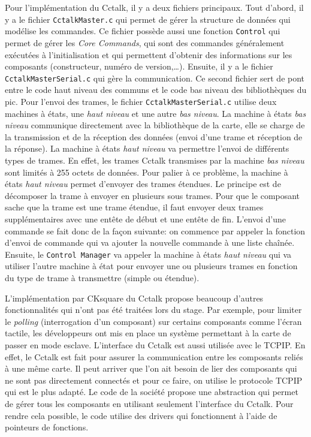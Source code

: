 \documentclass[a4paper]{article}
\begin{document}
Pour l'implémentation du Cctalk, il y a deux fichiers principaux. Tout d'abord,
il y a le fichier \verb|CctalkMaster.c| qui permet de gérer la structure de
données qui modélise les commandes. Ce fichier possède aussi une fonction
\verb|Control| qui permet de gérer les \textit{Core Commands}, qui sont des
commandes généralement exécutées à l'initialisation et qui permettent d'obtenir
des informations sur les composants (constructeur, numéro de version,\dots).
Ensuite, il y a le fichier \verb|CctalkMasterSerial.c| qui gère la
communication. Ce second fichier sert de pont entre le code haut niveau des
communs et le code bas niveau des bibliothèques du \gls{pic}. Pour l'envoi des
trames, le fichier \verb|CctalkMasterSerial.c| utilise deux machines à états,
une \textit{haut niveau} et une autre \textit{bas niveau}. La machine à états
\textit{bas niveau} communique directement avec la bibliothèque de la carte,
elle se charge de la transmission et de la réception des données (envoi d'une
trame et réception de la réponse). La machine à états \textit{haut niveau} va
permettre l'envoi de différents types de trames. En effet, les trames Cctalk
transmises par la machine \textit{bas niveau} sont limités à 255 octets de
données. Pour palier à ce problème, la machine à états \textit{haut niveau}
permet d'envoyer des trames étendues. Le principe est de décomposer la trame à
envoyer en plusieurs sous trames. Pour que le composant sache que la trame est
une trame étendue, il faut envoyer deux trames supplémentaires avec une entête
de début et une entête de fin. L'envoi d'une commande se fait donc de la façon
suivante: on commence par appeler la fonction d'envoi de commande qui va ajouter
la nouvelle commande à une liste chaînée. Ensuite, le \verb|Control Manager| va
appeler la machine à états \textit{haut niveau} qui va utiliser l'autre machine
à état pour envoyer une ou plusieurs trames en fonction du type de trame à
transmettre (simple ou étendue).

L'implémentation par CKsquare du Cctalk propose beaucoup d'autres
fonctionnalités qui n'ont pas été traitées lors du stage. Par exemple, pour
limiter le \textit{polling} (interrogation d'un composant) sur certains
composants comme l'écran tactile, les développeurs ont mis en place un système
permettant à la carte de passer en mode esclave. L'interface du Cctalk est aussi
utilisée avec le TCPIP. En effet, le Cctalk est fait pour assurer la
communication entre les composants reliés à une même carte. Il peut arriver que
l'on ait besoin de lier des composants qui ne sont pas directement connectés et
pour ce faire, on utilise le protocole TCPIP qui est le plus adapté. Le code de
la société propose une abstraction qui permet de gérer tous les composants en
utilisant seulement l'interface du Cctalk. Pour rendre cela possible, le code
utilise des drivers qui fonctionnent à l'aide de pointeurs de fonctions.
\end{document}
